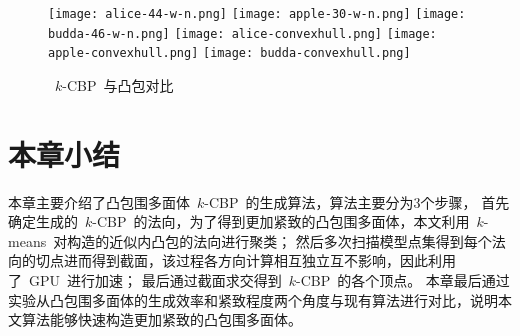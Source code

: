 \begin{figure}[!ht] 
\centering
{}
{  
   \texttt{[image: alice-44-w-n.png]}
}
{
    \texttt{[image: apple-30-w-n.png]}
}
{  
}
{  
   \texttt{[image: budda-46-w-n.png]}
}
\linebreak
{}
{  
   \texttt{[image: alice-convexhull.png]}
}
{
    \texttt{[image: apple-convexhull.png]}
}
{  
}
{  
   \texttt{[image: budda-convexhull.png]}
}
\linebreak
{}
{
}
{  
}
\caption{~$k$-CBP~与凸包对比}
\label{pic:exps:ch-kcbp}
\end{figure}

\section{本章小结}
\label{sec:chap02:summary}

本章主要介绍了凸包围多面体~$k$-CBP~的生成算法，算法主要分为3个步骤，
首先确定生成的~$k$-CBP~的法向，为了得到更加紧致的凸包围多面体，本文利用~$k$-means~对构造的近似内凸包的法向进行聚类；
然后多次扫描模型点集得到每个法向的切点进而得到截面，该过程各方向计算相互独立互不影响，因此利用了~GPU~进行加速；
最后通过截面求交得到~$k$-CBP~的各个顶点。
本章最后通过实验从凸包围多面体的生成效率和紧致程度两个角度与现有算法进行对比，说明本文算法能够快速构造更加紧致的凸包围多面体。

